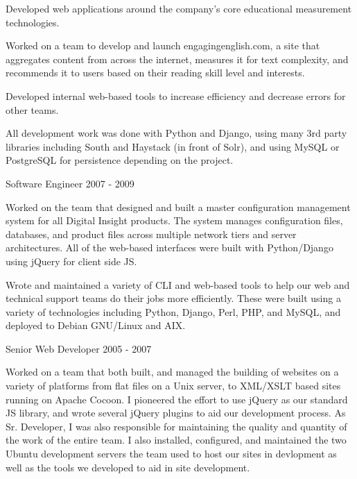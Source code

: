 \documentclass[11pt]{article} %
\begin{document}
\begin{description}
\item Developed web applications around the company's core educational measurement technologies.

\item Worked on a team to develop and launch engagingenglish.com, a site that aggregates content from across the internet,
measures it for text complexity, and recommends it to users based on their reading skill level and interests.

\item Developed internal web-based tools to increase efficiency and decrease errors for other teams.

\item All development work was done with Python and Django, using many 3rd party libraries including South and Haystack
(in front of Solr), and using MySQL or PostgreSQL for persistence depending on the project.

           {Software Engineer}
           {2007 - 2009}

\item Worked on the team that designed and built a master configuration management system for all Digital Insight products.
The system manages configuration files, databases, and product files across multiple network tiers and server architectures.
All of the web-based interfaces were built with Python/Django using jQuery for client side JS.

\item Wrote and maintained a variety of CLI and web-based tools to help our web and technical support teams do their jobs more efficiently.
These were built using a variety of technologies including Python, Django, Perl, PHP, and MySQL, and deployed to Debian GNU/Linux and AIX.

           {Senior Web Developer}
           {2005 - 2007}

\item Worked on a team that both built, and managed the building of websites on a variety of platforms from flat files on a Unix server,
to XML/XSLT based sites running on Apache Cocoon. I pioneered the effort to use jQuery as our standard JS library,
and wrote several jQuery plugins to aid our development process. As Sr. Developer, I was also responsible for
maintaining the quality and quantity of the work of the entire team. I also installed, configured, and maintained
the two Ubuntu development servers the team used to host our sites in devlopment as well as the tools we developed
to aid in site development.


\end{description}
\end{document}
